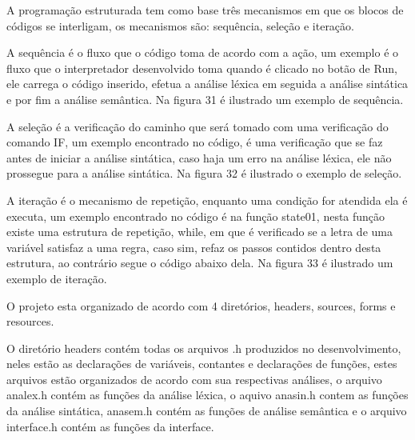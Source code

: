 \documentclass[12pt,oneside,a4paper,chapter=TITLE,section=TITLE,sumario=tradicional]{abntex2}
\begin{document}
A programação estruturada tem como base três mecanismos em que os blocos de códigos se interligam, os mecanismos são: sequência, seleção e iteração\cite{ivan2003}.

A sequência é o fluxo que o código toma de acordo com a ação\cite{ivan2003}, um exemplo é o fluxo que o interpretador desenvolvido toma quando é clicado no botão de Run, ele carrega o código inserido, efetua a análise léxica em seguida a análise sintática e por fim a análise semântica. Na figura 31 é ilustrado um exemplo de sequência.

\begin{figure}[htb]
\end{figure}

A seleção é a verificação do caminho que será tomado com uma verificação do comando IF\cite{ivan2003}, um exemplo encontrado no código, é uma verificação que se faz antes de iniciar a análise sintática, caso haja um erro na análise léxica, ele não prossegue para a análise sintática. Na figura 32 é ilustrado o exemplo de seleção.

\begin{figure}[htb]
\end{figure}

A iteração é o mecanismo de repetição, enquanto uma condição for atendida ela é executa\cite{ivan2003}, um exemplo encontrado no código é na função state01, nesta função existe uma estrutura de repetição, while, em que é verificado se a letra de uma variável satisfaz a uma regra, caso sim, refaz os passos contidos dentro desta estrutura, ao contrário segue o código abaixo dela. Na figura 33 é ilustrado um exemplo de iteração.

\begin{figure}[htb]
\end{figure}

O projeto esta organizado de acordo com 4 diretórios, headers, sources, forms e resources.

O diretório headers contém todas os arquivos .h produzidos no desenvolvimento, neles estão as declarações de variáveis, contantes e declarações de funções, estes arquivos estão organizados de acordo com sua respectivas análises, o arquivo analex.h contém as funções da análise léxica, o aquivo anasin.h contem as funções da análise sintática, anasem.h contém as funções de análise semântica e o arquivo interface.h contém as funções da interface.
\end{document}
